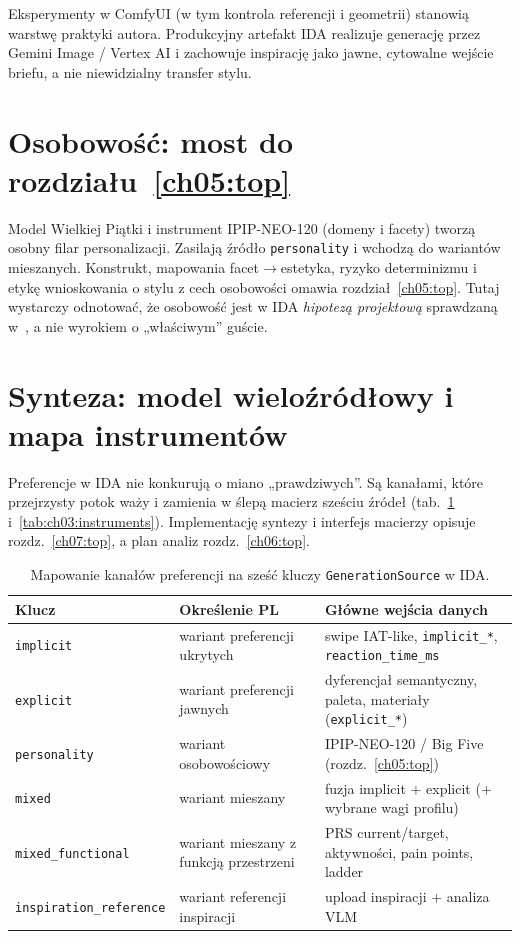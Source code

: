 Eksperymenty w ComfyUI (w tym kontrola referencji i geometrii) stanowią warstwę praktyki autora. Produkcyjny artefakt IDA realizuje generację przez Gemini Image / Vertex AI i zachowuje inspirację jako jawne, cytowalne wejście briefu, a nie niewidzialny transfer stylu.

\section{Osobowość: most do rozdziału~\ref{ch05:top}}
\label{ch03:sec:bigfive-bridge}

Model Wielkiej Piątki i instrument IPIP-NEO-120 (domeny i facety) tworzą osobny filar personalizacji. Zasilają źródło \texttt{personality} i wchodzą do wariantów mieszanych.
Konstrukt, mapowania facet$\rightarrow$estetyka, ryzyko determinizmu i etykę wnioskowania o stylu z cech osobowości omawia rozdział~\ref{ch05:top}.
Tutaj wystarczy odnotować, że osobowość jest w IDA \emph{hipotezą projektową} sprawdzaną w~, a nie wyrokiem o „właściwym” guście.

\section{Synteza: model wieloźródłowy i mapa instrumentów}
\label{ch03:sec:synteza}

Preferencje w IDA nie konkurują o miano „prawdziwych”. Są kanałami, które przejrzysty potok waży i zamienia w ślepą macierz sześciu źródeł (tab.~\ref{tab:ch03:sources} i~\ref{tab:ch03:instruments}).
Implementację syntezy i interfejs macierzy opisuje rozdz.~\ref{ch07:top}, a plan analiz rozdz.~\ref{ch06:top}.

\begin{table}[htbp]
  \centering
  \caption{Mapowanie kanałów preferencji na sześć kluczy \texttt{GenerationSource} w IDA.}
  \label{tab:ch03:sources}
  \begin{tabular}{@{}llp{}@{}}
    \toprule
    Klucz & Określenie PL & Główne wejścia danych \\
    \midrule
    \texttt{implicit}
      & wariant preferencji ukrytych
      & swipe IAT-like, \texttt{implicit\_*}, \texttt{reaction\_time\_ms} \\
    \texttt{explicit}
      & wariant preferencji jawnych
      & dyferencjał semantyczny, paleta, materiały (\texttt{explicit\_*}) \\
    \texttt{personality}
      & wariant osobowościowy
      & IPIP-NEO-120 / Big Five (rozdz.~\ref{ch05:top}) \\
    \texttt{mixed}
      & wariant mieszany
      & fuzja implicit + explicit (+ wybrane wagi profilu) \\
    \texttt{mixed\_functional}
      & wariant mieszany z funkcją przestrzeni
      & PRS current/target, aktywności, pain points, ladder \\
    \texttt{inspiration\_reference}
      & wariant referencji inspiracji
      & upload inspiracji + analiza VLM \\
    \bottomrule
  \end{tabular}
\end{table}

